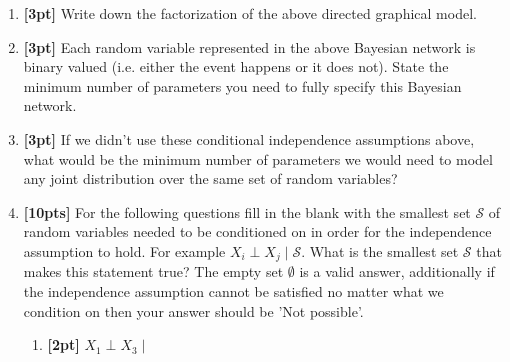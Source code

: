 \begin{enumerate}
\item \textbf{[3pt]} Write down the factorization of the above directed graphical model.

\begin{tcolorbox}[fit,height=1cm, width=15cm, blank, borderline={1pt}{-2pt},nobeforeafter]
\end{tcolorbox}


\item \textbf{[3pt]} Each random variable represented in the above Bayesian network is binary valued (i.e. either the event happens or it does not). State the minimum number of parameters you need to fully specify  this Bayesian network.

\begin{tcolorbox}[fit,height=1cm, width=2cm, blank, borderline={1pt}{-2pt},nobeforeafter]
\end{tcolorbox}


\item \textbf{[3pt]} If we didn't use these conditional independence assumptions above, what would be the minimum number of parameters we would need to model any joint distribution over the same set of random variables?

\begin{tcolorbox}[fit,height=1cm, width=2cm, blank, borderline={1pt}{-2pt},nobeforeafter]
\end{tcolorbox}



\item \textbf{[10pts]} For the following questions fill in the blank with the smallest set $\mathcal{S}$ of random variables needed to be conditioned on in order for the independence assumption to hold. For example $X_i \perp X_j \mid \mathcal{S}$. What is the smallest set $\mathcal{S}$ that makes this statement true? The empty set $\emptyset$ is a valid answer, additionally if the independence assumption cannot be satisfied no matter what we condition on then your answer should be 'Not possible'.
\begin{enumerate}

\item \textbf{[2pt]} $X_1 \perp X_3 \mid $ \begin{tcolorbox}[fit,height=1cm, width=2cm, blank, borderline={1pt}{-2pt},nobeforeafter]
\end{tcolorbox}  \\


\end{enumerate}
\end{enumerate}
